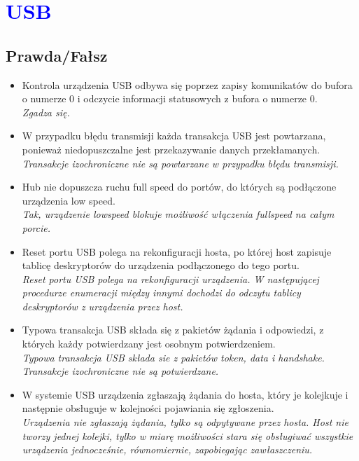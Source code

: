 \documentclass[a4paper,twoside]{article}
\begin{document}
\section{\textcolor{blue}{USB}}
\subsection*{Prawda/Fałsz}
\begin{itemize}
	
	\item \textcolor{tak}{Kontrola urządzenia USB odbywa się poprzez zapisy komunikatów do bufora o numerze 0 i odczycie informacji statusowych z bufora o numerze 0.} \\
	{\small \emph{Zgadza się.}}
	
	\item \textcolor{nie}{W przypadku błędu transmisji każda transakcja USB jest powtarzana, ponieważ niedopuszczalne jest przekazywanie danych przekłamanych.} \\
	{\small \emph{Transakcje izochroniczne nie są powtarzane w przypadku błędu transmisji.}}
	
	\item \textcolor{tak}{Hub nie dopuszcza ruchu full speed do portów, do których są podłączone urządzenia low speed.} \\
	{\small \emph{Tak, urządzenie lowspeed blokuje możliwość włączenia fullspeed na całym porcie.}}
	
	\item \textcolor{nie}{Reset portu USB polega na rekonfiguracji hosta, po której host zapisuje tablicę deskryptorów do urządzenia podłączonego do tego portu.} \\
	{\small \emph{Reset portu USB polega na rekonfiguracji urządzenia. W następującej procedurze enumeracji między innymi dochodzi do odczytu tablicy deskryptorów z urządzenia przez host.}}
	
	\item \textcolor{nie}{Typowa transakcja USB składa się z pakietów żądania i odpowiedzi, z których każdy potwierdzany jest osobnym potwierdzeniem.} \\
	{\small \emph{Typowa transakcja USB składa sie z pakietów token, data i handshake. Transakcje izochroniczne nie są potwierdzane.}}
	
	\item \textcolor{nie}{W systemie USB urządzenia zgłaszają żądania do hosta, który je kolejkuje i następnie obsługuje w kolejności pojawiania się zgłoszenia.} \\
	{\small \emph{Urządzenia nie zgłaszają żądania, tylko są odpytywane przez hosta. Host nie tworzy jednej kolejki, tylko w miarę możliwości stara się obsługiwać wszystkie urządzenia jednocześnie, równomiernie, zapobiegając zawłaszczeniu.}}
	

\end{itemize}
\end{document}
